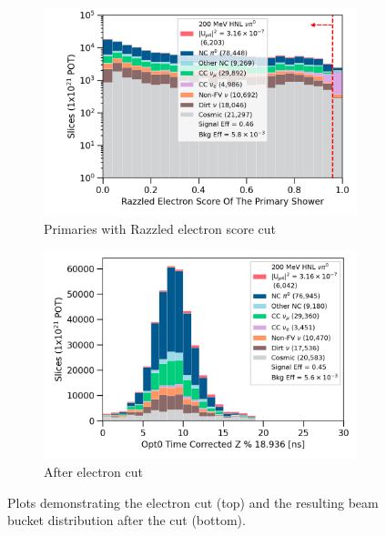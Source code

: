 \begin{figure}[htbp!]
        \begin{subfigure}[b]{0.495\textwidth}   
            \centering 
            \includegraphics[width=\textwidth]{razzled_electron_score_prim_shw_precut}
            \caption{Primaries with Razzled electron score cut}%
            \label{fig:nrazzled_electron_full}
        \end{subfigure}
        \hfill
        \begin{subfigure}[b]{0.495\textwidth}   
            \centering 
            \includegraphics[width=\textwidth]{beam_bucket_postelectron}
            \caption{After electron cut}%
            \label{fig:bb_post_electron}
        \end{subfigure}
        \caption{
		Plots demonstrating the electron cut (top) and the resulting beam bucket distribution after the cut (bottom). 
	}
        \label{fig:razzled_electron_cut}
\end{figure}
